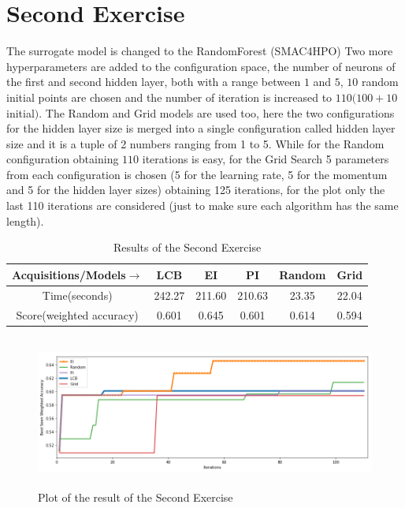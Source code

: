\documentclass[12pt, onecolumn]{article}
\begin{document}
\section*{Second Exercise}
The surrogate model is changed to the RandomForest (SMAC4HPO) Two more hyperparameters are added to the configuration space, the number of neurons of the first and second hidden layer, both with a range between $1$ and $5$, $10$ random initial points are chosen and the number of iteration is increased to $110 (100 + 10$ initial$)$.
The Random and Grid models are used too, here the two configurations for the hidden layer size is merged into a single configuration called hidden layer size and it is a tuple of 2 numbers ranging from 1 to 5.
While for the Random configuration obtaining $110$ iterations is easy, for the Grid Search 5 parameters from each configuration is chosen (5 for the learning rate, 5 for the momentum and 5 for the hidden layer sizes) obtaining 125 iterations, for the plot only the last 110 iterations are considered (just to make sure each algorithm has the same length).   
\begin{table}[!h]
  \centering
  \begin{tabular}{ |c|c|c|c|c|c| } 
    \hline
    Acquisitions/Models$\to$ & LCB  & EI & PI & Random & Grid \\
    \hline
    Time(seconds) & 242.27 & 211.60 & 210.63 & 23.35 & 22.04\\
    \hline
    Score(weighted accuracy) & 0.601 & 0.645 & 0.601 & 0.614 & 0.594\\ 
    \hline
  \end{tabular}
  \caption{Results of the Second Exercise}
  \label{tab:Ex2_res}
\end{table}

\begin{figure}[!h]
  \centering
  \includegraphics[width=\linewidth, height=5cm]{imgs/second.png}
  \caption{Plot of the result of the Second Exercise}
  \label{fig:second}
\end{figure}
\end{document}
